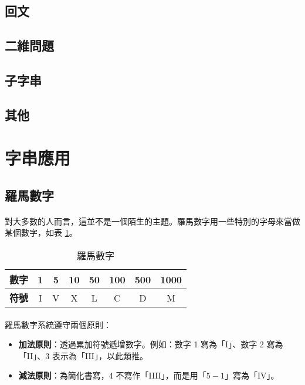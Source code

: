 \documentclass[12pt,a4paper,oneside]{report}
\begin{document}
\begin{CJK}{UTF8}{bkai}
\subsection{回文}

\subsection{二維問題}

\subsection{子字串}

\subsection{其他}


\section{字串應用}
\subsection{羅馬數字}

\paragraph{}對大多數的人而言，這並不是一個陌生的主題。羅馬數字用一些特別的字母來當做某個數字，如表 \ref{string:mani:table:roman:number}。

\begin{table}[h!]
  \centering
  \begin{tabular}{|c||c|c|c|c|c|c|c|}
  \hline
  \textbf{數字} & 1 & 5 & 10 & 50 & 100 & 500 & 1000\\
  \hline
  \textbf{符號} & I & V & X & L & C & D & M\\
  \hline
  \end{tabular}
  \caption{羅馬數字}
  \label{string:mani:table:roman:number}
\end{table}

\paragraph{}羅馬數字系統遵守兩個原則：

\begin{itemize}
\item \textbf{加法原則}：透過累加符號遞增數字。例如：數字 1 寫為「I」、數字 2 寫為「II」、3 表示為「III」，以此類推。
\item \textbf{減法原則}：為簡化書寫，4 不寫作「IIII」，而是用「$5-1$」寫為「IV」。
\end{itemize}


\end{CJK}
\end{document}
